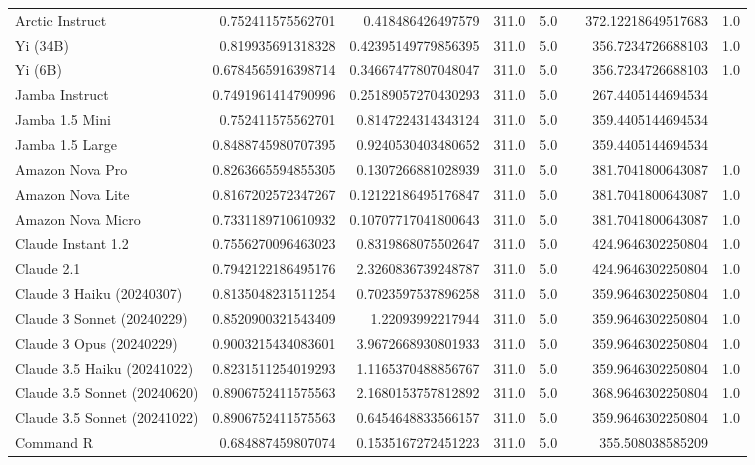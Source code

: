 \begin{table}[htp]
{\begin{tabular}{lrrrrrrr}
Arctic Instruct & 0.752411575562701 & 0.418486426497579 & 311.0 & 5.0 &  & 372.12218649517683 & 1.0 \\
Yi (34B) & 0.819935691318328 & 0.42395149779856395 & 311.0 & 5.0 &  & 356.7234726688103 & 1.0 \\
Yi (6B) & 0.6784565916398714 & 0.34667477807048047 & 311.0 & 5.0 &  & 356.7234726688103 & 1.0 \\
Jamba Instruct & 0.7491961414790996 & 0.25189057270430293 & 311.0 & 5.0 &  & 267.4405144694534 &  \\
Jamba 1.5 Mini & 0.752411575562701 & 0.8147224314343124 & 311.0 & 5.0 &  & 359.4405144694534 &  \\
Jamba 1.5 Large & 0.8488745980707395 & 0.9240530403480652 & 311.0 & 5.0 &  & 359.4405144694534 &  \\
Amazon Nova Pro & 0.8263665594855305 & 0.1307266881028939 & 311.0 & 5.0 &  & 381.7041800643087 & 1.0 \\
Amazon Nova Lite & 0.8167202572347267 & 0.12122186495176847 & 311.0 & 5.0 &  & 381.7041800643087 & 1.0 \\
Amazon Nova Micro & 0.7331189710610932 & 0.10707717041800643 & 311.0 & 5.0 &  & 381.7041800643087 & 1.0 \\
Claude Instant 1.2 & 0.7556270096463023 & 0.8319868075502647 & 311.0 & 5.0 &  & 424.9646302250804 & 1.0 \\
Claude 2.1 & 0.7942122186495176 & 2.3260836739248787 & 311.0 & 5.0 &  & 424.9646302250804 & 1.0 \\
Claude 3 Haiku (20240307) & 0.8135048231511254 & 0.7023597537896258 & 311.0 & 5.0 &  & 359.9646302250804 & 1.0 \\
Claude 3 Sonnet (20240229) & 0.8520900321543409 & 1.22093992217944 & 311.0 & 5.0 &  & 359.9646302250804 & 1.0 \\
Claude 3 Opus (20240229) & 0.9003215434083601 & 3.9672668930801933 & 311.0 & 5.0 &  & 359.9646302250804 & 1.0 \\
Claude 3.5 Haiku (20241022) & 0.8231511254019293 & 1.1165370488856767 & 311.0 & 5.0 &  & 359.9646302250804 & 1.0 \\
Claude 3.5 Sonnet (20240620) & 0.8906752411575563 & 2.1680153757812892 & 311.0 & 5.0 &  & 368.9646302250804 & 1.0 \\
Claude 3.5 Sonnet (20241022) & 0.8906752411575563 & 0.6454648833566157 & 311.0 & 5.0 &  & 359.9646302250804 & 1.0 \\
Command R & 0.684887459807074 & 0.1535167272451223 & 311.0 & 5.0 &  & 355.508038585209 &  \\

\end{tabular}}
\end{table}
